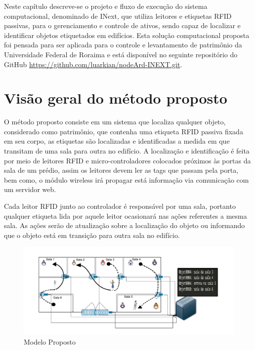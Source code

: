 \label{chapter:metodo}

Neste capítulo descreve-se o projeto e fluxo de execução do sistema computacional, denominado de INext, que utiliza leitores e etiquetas RFID passivas, para o gerenciamento e controle de ativos, sendo capaz de localizar e identificar objetos etiquetados em edifícios.
%
%
Esta solução computacional proposta foi pensada para ser aplicada para o controle e levantamento de patrimônio da Universidade Federal de Roraima e está disponível no seguinte repositório do GitHub \url{https://github.com/luarkian/nodeArd-INEXT.git}.

%
%
\section{Visão geral do método proposto}

O método proposto consiste em um sistema que localiza qualquer objeto, considerado como patrimônio, que contenha uma etiqueta RFID passiva fixada em seu corpo, as etiquetas são localizadas e identificadas a medida em que transitam de uma sala para outra no edifício.
%
A localização e identificação é feita por meio de leitores RFID e micro-controladores colocados próximos às portas da sala
de um prédio, assim os leitores devem ler as tags que passam pela porta, bem como, o módulo wireless irá propagar está informação via
comunicação com um servidor web. 


Cada leitor RFID junto ao controlador é responsável por uma sala, portanto qualquer etiqueta lida por aquele leitor
ocasionará nas ações referentes a mesma sala. As ações serão de atualização sobre a localização do objeto ou informando
que o objeto está em transição para outra sala no edifício.
\begin{figure}[H]
              \caption{\label{fig:modelo}{Modelo Proposto}}
              \centering
              \includegraphics[width=1.1\textwidth]{Figuras/bigpicture.png}
        \end{figure}

